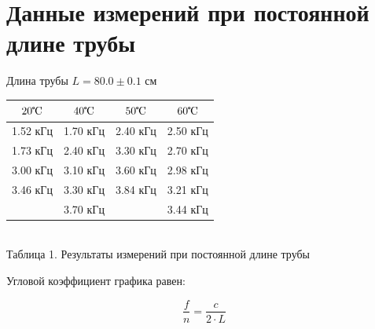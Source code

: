 \documentclass[a4paper, 12pt]{article}
\begin{document}
\section{Данные измерений при постоянной длине трубы}
Длина трубы $L = 80.0 \pm 0.1$ см
\begin{center}
	\begin{tabular} {|c | c |c |c |}
		\hline	
		$20 \tccelsius$ & $40 \tccelsius$ & $50 \tccelsius$ & $60 \tccelsius$\\
		\hline
		1.52 кГц &  1.70 кГц & 2.40 кГц & 2.50 кГц\\
		\hline
		1.73 кГц &  2.40 кГц & 3.30 кГц & 2.70 кГц\\
		\hline
		3.00 кГц &  3.10 кГц & 3.60 кГц & 2.98 кГц\\
		\hline
		3.46 кГц &  3.30 кГц & 3.84 кГц & 3.21 кГц\\
		\hline
		&  3.70 кГц &  & 3.44 кГц\\
		\hline
	\end{tabular}\\
	Таблица 1. Результаты измерений при постоянной длине трубы
\end{center}
	Угловой коэффициент графика равен:
	\begin{center}
		\begin{equation}
			\frac{f}{n} = \frac{c}{2\cdot L}
		\end{equation}
	\end{center}
\end{document}
